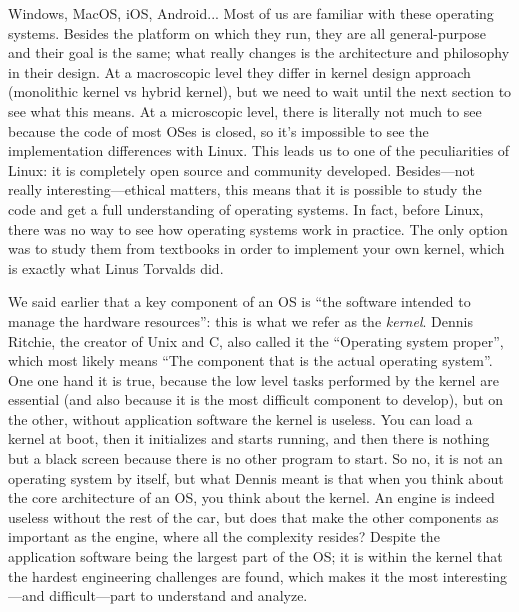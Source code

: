 \documentclass[10pt]{book}
\begin{document}
Windows, MacOS, iOS, Android... Most of us are familiar with these operating systems. Besides the platform on which they run, they are all general-purpose and their goal is the same; what really changes is the architecture and philosophy in their design. At a macroscopic level they differ in kernel design approach (monolithic kernel vs hybrid kernel), but we need to wait until the next section to see what this means. At a microscopic level, there is literally not much to see because the code of most OSes is closed, so it's impossible to see the implementation differences with Linux. This leads us to one of the peculiarities of Linux: it is completely open source and community developed. Besides---not really interesting---ethical matters, this means that it is possible to study the code and get a full understanding of operating systems. In fact, before Linux, there was no way to see how operating systems work in practice. The only option was to study them from textbooks in order to implement your own kernel, which is exactly what Linus Torvalds did.

We said earlier that a key component of an OS is ``the software intended to manage the hardware resources'': this is what we refer as the \textit{kernel}. Dennis Ritchie, the creator of Unix and C, also called it the ``Operating system proper''\cite{ritchie}, which most likely means ``The component that is the actual operating system''. One one hand it is true, because the low level tasks performed by the kernel are essential (and also because it is the most difficult component to develop), but on the other, without application software the kernel is useless. You can load a kernel at boot, then it initializes and starts running, and then there is nothing but a black screen because there is no other program to start. So no, it is not an operating system by itself, but what Dennis meant is that when you think about the core architecture of an OS, you think about the kernel. An engine is indeed useless without the rest of the car, but does that make the other components as important as the engine, where all the complexity resides? Despite the application software being the largest part of the OS; it is within the kernel that the hardest engineering challenges are found, which makes it the most interesting---and difficult---part to understand and analyze.
\end{document}
